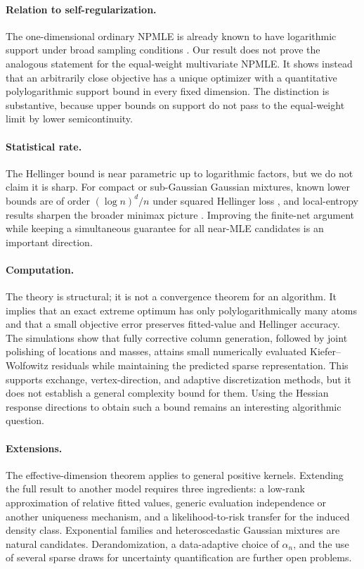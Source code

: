 \documentclass[11pt]{article}
\theoremstyle{definition}
\theoremstyle{remark}
\begin{document}
\paragraph{Relation to self-regularization.}
The one-dimensional ordinary NPMLE is already known to have logarithmic
support under broad sampling conditions \citep{polyanskiywu2020}.  Our result
does not prove the analogous statement for the equal-weight multivariate
NPMLE\@.  It shows instead that an arbitrarily close objective has a unique
optimizer with a quantitative polylogarithmic support bound in every fixed
dimension.  The distinction is substantive, because upper bounds on support
do not pass to the equal-weight limit by lower semicontinuity.

\paragraph{Statistical rate.}
The Hellinger bound is near parametric up to logarithmic factors, but we do
not claim it is sharp.  For compact or sub-Gaussian Gaussian mixtures, known
lower bounds are of order $(\log n)^d/n$ under squared Hellinger loss
\citep{kimguntuboyina2022}, and local-entropy results sharpen the broader
minimax picture \citep{jiaetal2023}.  Improving the finite-net argument while
keeping a simultaneous guarantee for all near-MLE candidates is an important
direction.

\paragraph{Computation.}
The theory is structural; it is not a convergence theorem for an algorithm.
It implies that an exact extreme optimum has only polylogarithmically many
atoms and that a small objective error preserves fitted-value and Hellinger
accuracy.  The simulations show that fully corrective column generation,
followed by joint polishing of locations and masses, attains small numerically evaluated
Kiefer--Wolfowitz residuals while maintaining the predicted sparse
representation.  This supports exchange, vertex-direction, and adaptive
discretization methods, but it does not establish a general complexity bound
for them.  Using the Hessian response directions to obtain such a bound
remains an interesting algorithmic question.

\paragraph{Extensions.}
The effective-dimension theorem applies to general positive kernels.
Extending the full result to another model requires three ingredients: a
low-rank approximation of relative fitted values, generic evaluation
independence or another uniqueness mechanism, and a likelihood-to-risk
transfer for the induced density class.  Exponential families and
heteroscedastic Gaussian mixtures are natural candidates.  Derandomization, a
data-adaptive choice of $\alpha_n$, and the use of several sparse draws for
uncertainty quantification are further open problems.
\end{document}

